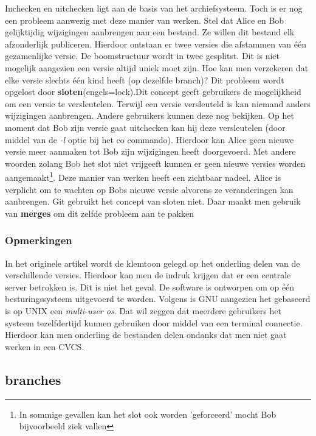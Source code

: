 Inchecken en uitchecken ligt aan de basis van het archiefsysteem. Toch is er nog een probleem aanwezig met deze manier van werken. Stel dat Alice en Bob gelijktijdig wijzigingen aanbrengen aan een bestand. Ze willen dit bestand elk afzonderlijk publiceren.  Hierdoor ontstaan er twee versies die afstammen van één gezamenlijke versie. De boomstructuur wordt in twee gesplitst. Dit is niet mogelijk aangezien een versie altijd uniek moet zijn. Hoe kan men verzekeren dat elke versie slechts één kind heeft (op dezelfde branch)? Dit probleem wordt opgelost door \textbf{sloten}(engels=lock).Dit concept geeft gebruikers de mogelijkheid om een versie te  versleutelen. Terwijl een versie versleuteld is kan niemand anders wijzigingen aanbrengen. Andere gebruikers kunnen deze nog bekijken. Op het moment dat Bob zijn versie gaat uitchecken kan hij deze versleutelen (door middel van de \textit{-l} optie bij het co commando). Hierdoor kan Alice geen nieuwe versie meer aanmaken tot Bob zijn wijzigingen heeft doorgevoerd. Met andere woorden zolang Bob het slot niet vrijgeeft kunnen er geen nieuwe versies worden aangemaakt\footnote{In sommige gevallen kan het slot ook worden 'geforceerd' mocht Bob bijvoorbeeld ziek vallen}. Deze manier van werken heeft een zichtbaar nadeel. Alice is verplicht om te wachten op Bobs nieuwe versie alvorens ze veranderingen kan aanbrengen. Git gebruikt het concept van sloten niet. Daar maakt men gebruik van \textbf{merges} om dit zelfde probleem aan te pakken %

\subsubsection{Opmerkingen}
In het originele artikel wordt de klemtoon gelegd op het onderling delen van de verschillende versies. Hierdoor kan men de indruk krijgen dat er een centrale server betrokken is. Dit is niet het geval. De software is ontworpen om op één besturingssysteem uitgevoerd te worden. Volgens \textcite{Debian2020} is GNU aangezien het gebaseerd is op UNIX een \textit{multi-user os}. Dat wil zeggen dat meerdere gebruikers het systeem tezelfdertijd kunnen gebruiken door middel van een terminal connectie. Hierdoor kan men onderling de bestanden delen ondanks dat men niet gaat werken in een CVCS.

\subsection{branches}
\label{par:branches}
